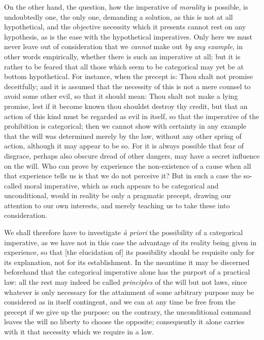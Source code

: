 \snip

On the other hand, the question, how the imperative of
\textit{morality} is possible, is undoubtedly one, the only one,
demanding a solution, as this is not at all hypothetical, and the
objective necessity which it presents cannot rest on any hypothesis,
as is the ease with the hypothetical imperatives. Only here we must
never leave out of consideration that we \textit{cannot} make out
\textit{by any example}, in other words empirically, whether there is
such an imperative at all; but it is rather to be feared that all
those which seem to be categorical may yet be at bottom hypothetical.
For instance, when the precept is: Thou shalt not promise deceitfully;
and it is assumed that the necessity of this is not a mere counsel to
avoid some other evil, so that it should mean: Thou shalt not make a
lying promise, lest if it become known thou shouldst destroy thy
credit, but that an action of this kind must be regarded as evil in
itself, so that the imperative of the prohibition is categorical; then
we cannot  show with certainty in any example that the will
was determined merely by the law, without any other spring of action,
although it may appear to be so. For it is always possible that fear
of disgrace, perhaps also obscure dread of other dangers, may have a
secret influence on the will. Who can prove by experience the
non-existence of a cause when all that experience tells us is that we
do not perceive it? But in such a case the so-called moral imperative,
which as such appears to be categorical and unconditional, would in
reality be only a pragmatic precept, drawing our attention to our own
interests, and merely teaching us to take these into consideration.

We shall therefore have to investigate \textit{\`a priori} the
possibility of a categorical imperative, as we have not in this case
the advantage of its reality being given in experience, so that [the
elucidation of] its possibility should be requisite only for its
explanation, not for its establishment. In the meantime it may be
discerned beforehand that the categorical imperative alone has the
purport of a practical law: all the rest may indeed be called
\textit{principles} of the will but not laws, since whatever is only
necessary for the attainment of some arbitrary purpose may be
considered as in itself contingent, and we can at any time be free
from the precept if we give up the purpose: on the contrary, the
unconditional command leaves the will no liberty to choose the
opposite; consequently it alone carries with it that necessity which
we require in a law.

